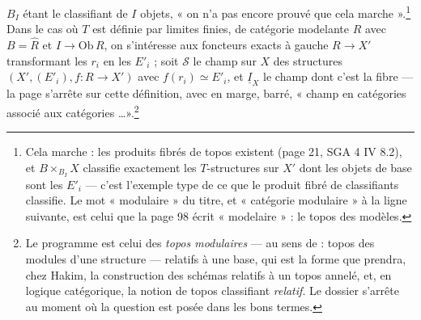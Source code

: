 \documentclass[11pt,a4paper]{article}
\begin{document}

$B_{I}$ étant le classifiant de $I$ objets, « on n'a pas encore prouvé que
cela marche ».\footnote{Cela marche : les produits fibrés de topos
existent (page 21, SGA 4 IV 8.2), et $B \times_{B_{I}} X$ classifie
exactement les $T$-structures sur $X'$ dont les objets de base sont les
$E'_{i}$ — c'est l'exemple type de ce que le produit fibré de classifiants
classifie. Le mot « modulaire » du titre, et « catégorie modulaire » à la
ligne suivante, est celui que la page 98 écrit « modelaire » : le topos
des modèles.} Dans le cas où $T$ est définie par limites finies, de
catégorie modelante $R$ avec $B = \widehat{R}$ et $I \to \mathrm{Ob}\,R$, on
s'intéresse aux foncteurs exacts à gauche $R \to X'$ transformant les
$r_{i}$ en les $E'_{i}$ ; soit $\mathcal{S}$ le champ sur $X$ des structures
$(X', (E'_{i}), f : R \to X')$ avec $f(r_{i}) \simeq E'_{i}$, et $\underline{I}
_{X}$ le champ dont c'est la fibre — la page s'arrête sur cette
définition, avec en marge, barré, « champ en catégories associé aux
catégories \ldots ».\footnote{Le programme est celui des \emph{topos
modulaires} — au sens de : topos des modules d'une structure — relatifs à
une base, qui est la forme que prendra, chez Hakim, la construction des
schémas relatifs à un topos annelé, et, en logique catégorique, la
notion de topos classifiant \emph{relatif}. Le dossier s'arrête au moment
où la question est posée dans les bons termes.}
\end{document}
